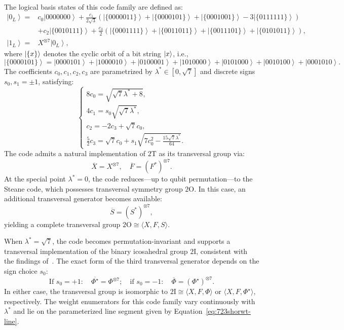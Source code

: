 \documentclass[8pt]{article}
\theoremstyle{definition}
\begin{document}
The logical basis states of this code family are defined as:
\begin{equation}\label{eq:723cyclic}
    \begin{aligned}
        \left|0_{L}\right\rangle = & c_{0}\left|0000000\right\rangle +\frac{c_{1}}{2\sqrt{3}}\left(\left|\{0000011\}\right\rangle +\left|\{0000101\}\right\rangle +\left|\{0001001\}\right\rangle -3\left|\{0111111\}\right\rangle \right) \\&+c_{2}\left|\{0010111\}\right\rangle +\frac{c_{3}}{2}\left(\left|\{0001111\}\right\rangle +\left|\{0011011\}\right\rangle +\left|\{0011101\}\right\rangle +\left|\{0101011\}\right\rangle \right),\\
        \left|1_{L}\right\rangle=  & X^{\otimes 7}\left|0_{L}\right\rangle,
    \end{aligned}
\end{equation}
where \(\ket{\{x\}}\) denotes the cyclic orbit of a bit string \(\ket{x}\), i.e.,
\[ \left|\{0000101\}\right\rangle =\left|0000101\right\rangle +\left|1000010\right\rangle +\left|0100001\right\rangle +\left|1010000\right\rangle +\left|0101000\right\rangle +\left|0010100\right\rangle +\left|0001010\right\rangle .\]
The coefficients \(c_0, c_1, c_2, c_3\) are parametrized by \(\lambda^* \in [0, \sqrt{7}]\) and discrete signs \(s_0, s_1 = \pm 1\), satisfying:
\begin{equation}
    \begin{cases}
        8c_{0}=\sqrt{\sqrt{7}\lambda^{*}+8},    \\
        4c_{1}=s_{0}\sqrt{\sqrt{7}\lambda^{*}}, \\
        c_{2}=-2c_{3}+\sqrt{7}c_{0},            \\
        \tfrac{5}{2}c_{3}=\sqrt{7}c_{0}+s_{1}\sqrt{7c_{0}^{2}-\frac{15\sqrt{7}\lambda^{*}}{64}}.
    \end{cases}
\end{equation}
The code admits a natural implementation of \(2\mathrm{T}\) as its transversal group via:
\[ \overline{X}=X^{\otimes7},\quad \overline{F}=\left(F^{*}\right)^{\otimes7}.\]
At the special point \(\lambda^* = 0\), the code reduces—up to qubit permutation—to the Steane code, which possesses transversal symmetry group \(2\mathrm{O}\). In this case, an additional transversal generator becomes available:
\[ \overline{S}=\left(S^{*}\right)^{\otimes7}, \]
yielding a complete transversal group \(2\mathrm{O} \cong \langle X, F, S \rangle\).

When \(\lambda^* = \sqrt{7}\), the code becomes permutation-invariant and supports a transversal implementation of the binary icosahedral group \(2\mathrm{I}\), consistent with the findings of~\cite{pollatsek2004permutationally}. The exact form of the third transversal generator depends on the sign choice \(s_0\):
\[
    \text{If } s_0 = +1: \quad \overline{\Phi^{\star}} = \Phi^{\otimes 7}; \quad
    \text{if } s_0 = -1: \quad \overline{\Phi} = (\Phi^{\star})^{\otimes 7}.
\]
In either case, the transversal group is isomorphic to \(2\mathrm{I} \cong \langle X, F, \Phi \rangle\) or \(\langle X, F, \Phi^{\star} \rangle\), respectively. The weight enumerators for this code family vary continuously with \(\lambda^*\) and lie on the parameterized line segment given by Equation~\eqref{eq:723shorwt-line}.
\end{document}
